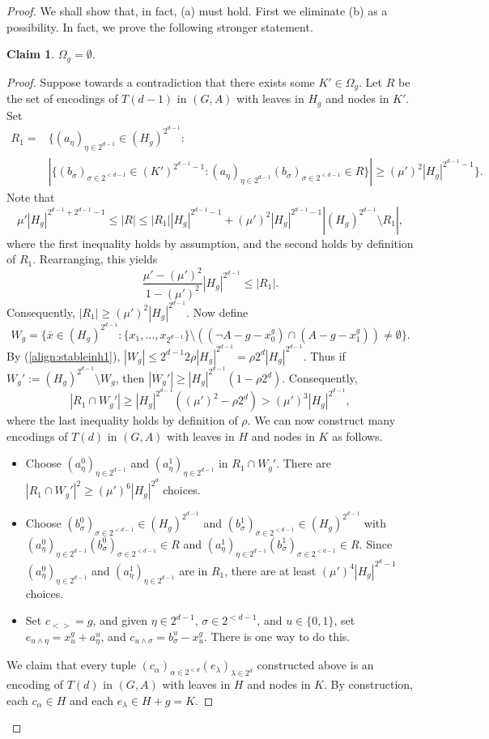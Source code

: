 \documentclass[12pt,oneside,british,a4wide]{amsart}
\newtheorem{claim}[theorem]{Claim}
\numberwithin{equation}{section}
\theoremstyle{definition}
\newcommand{\xbar}{\bar{x}}
\begin{document}
\begin{proof}
We shall show that, in fact, (a) must hold.  First we eliminate (b) as a possibility.  In fact, we prove the following stronger statement.

\begin{claim}\label{cl:omega}
$\Omega_g=\emptyset$.
\end{claim}
\begin{proof}
Suppose towards a contradiction that there exists some $K'\in \Omega_g$.  Let $R$ be the set of encodings of $T(d-1)$ in $(G,A)$ with leaves in $H_g$ and nodes in $K'$.   Set 
\begin{align*}
R_1=&\{(a_{\eta})_{\eta\in 2^{d-1}}\in (H_g)^{2^{d-1}}:\\
&|\{ (b_{\sigma})_{ \sigma\in 2^{<d-1}}\in (K')^{2^{d-1}-1}: (a_{\eta})_{\eta\in 2^{d-1}}(b_{\sigma})_{ \sigma\in 2^{<d-1}}\in R\}|\geq (\mu')^2|H_g|^{2^{d-1}-1}\}.
\end{align*}
Note that 
$$
\mu'|H_g|^{2^{d-1}+2^{d-1}-1}\leq |R|\leq |R_1||H_g|^{2^{d-1}-1}+(\mu')^2|H_g|^{2^{d-1}-1}|(H_g)^{2^{d-1}}\setminus R_1|,
$$
where the first inequality holds by assumption, and the second holds by definition of $R_1$.  Rearranging, this yields 
$$
 \frac{\mu'-(\mu')^2}{1-(\mu')^2}|H_g|^{2^{d-1}}\leq |R_1|.
$$
Consequently, $|R_1|\geq (\mu')^2|H_g|^{2^{d-1}}$.  Now define
$$
W_g=\{\xbar\in (H_g)^{2^{d-1}}: \{x_1,\ldots, x_{2^{d-1}}\}\setminus ((\neg A-g-x_0^g)\cap (A-g-x_1^g))\neq \emptyset\}.
$$ 
By (\ref{align:stableinh1}), $|W_g|\leq 2^{d-1}2\rho|H_g|^{2^{d-1}}=\rho2^{d}|H_g|^{2^{d-1}}$.  Thus if $W_g':=(H_g)^{2^{d-1}}\setminus W_g$, then $|W_g'|\geq |H_g|^{2^{d-1}}(1-\rho2^d)$.   Consequently,
$$
|R_1\cap W_g'|\geq |H_g|^{2^{d-1}}((\mu')^2- \rho2^d)>(\mu')^3 |H_g|^{2^{d-1}},
$$
where the last inequality holds by definition of $\rho$.  We can now construct many encodings of $T(d)$ in $(G,A)$ with leaves in $H$ and nodes in $K$ as follows.
\begin{itemize}
\item Choose $(a^0_{\eta})_{\eta\in 2^{d-1}}$ and $(a^1_{\eta})_{\eta\in 2^{d-1}}$ in $R_1\cap W_g'$.  There are $|R_1\cap W_g'|^2\geq (\mu')^6 |H_g|^{2^{d}}$ choices.
\item Choose $(b^0_{\sigma})_{ \sigma\in 2^{<d-1}}\in (H_g)^{2^{d-1}}$ and $(b^1_{\sigma})_{ \sigma\in 2^{<d-1}}\in (H_g)^{2^{d-1}}$ with $(a^0_{\eta})_{\eta\in 2^{d-1}}(b^0_{\sigma})_{ \sigma\in 2^{<d-1}}\in R$ and $(a^1_{\eta})_{\eta\in 2^{d-1}}(b^1_{\sigma})_{ \sigma\in 2^{<d-1}}\in R$.  Since $(a^0_{\eta})_{\eta\in 2^{d-1}}$ and $(a^1_{\eta})_{\eta\in 2^{d-1}}$ are in $R_1$, there are at least $(\mu')^4|H_g|^{2^{d}-1}$ choices.
\item Set $c_{<>}=g$, and given $\eta\in 2^{d-1}$, $\sigma\in 2^{<d-1}$, and $u\in \{0,1\}$, set $e_{u\wedge \eta}=x^g_u+a_{\eta}^u$, and $c_{u\wedge \sigma}=b_{\sigma}^u-x_u^g$.  There is one way to do this.
\end{itemize}
We claim that every tuple $(c_{\alpha})_{\alpha\in 2^{<d}}(e_{\lambda})_{\lambda\in 2^d}$ constructed above is an encoding of $T(d)$ in $(G,A)$ with leaves in $H$ and nodes in $K$.  By construction, each $c_{\alpha}\in H$ and each $e_{\lambda}\in H+g=K$.


\end{proof}
\end{proof}
\end{document}
